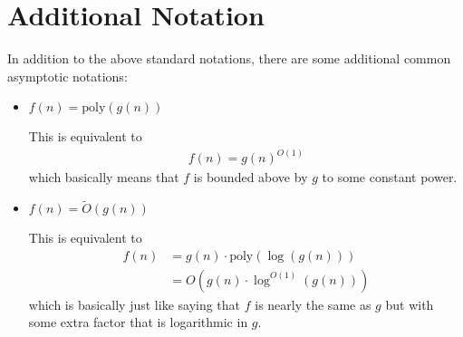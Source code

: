 \documentclass[10pt,a4paper]{article}
\begin{document}
\section*{Additional Notation}

In addition to the above standard notations, there are some additional common asymptotic notations:
\begin{itemize}
    \item $f(n) = \text{poly}(g(n))$
    
    This is equivalent to
    \begin{align*}
        f(n) = g(n)^{O(1)}
    \end{align*}
    which basically means that $f$ is bounded above by $g$ to some constant power.

    \item $f(n) = \tilde{O}(g(n))$
    
    This is equivalent to
    \begin{align*}
        f(n) &= g(n) \cdot \text{poly}(\log(g(n))) \\
        &= O(g(n) \cdot \log^ {O(1)}(g(n)) )
    \end{align*}
    which is basically just like saying that $f$ is nearly the same as $g$ but with some extra factor that is logarithmic in $g$.

\end{itemize}



\end{document}
